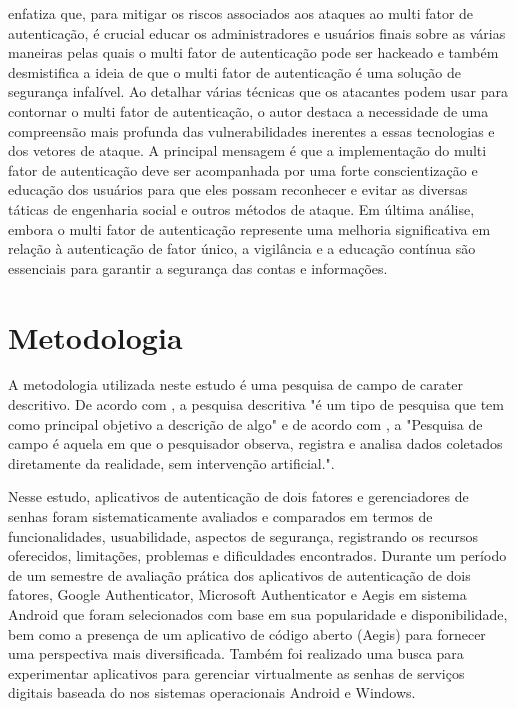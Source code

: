 \documentclass[12pt]{article}
\begin{document}
\cite{article:3} enfatiza que, para mitigar os riscos associados aos ataques ao multi fator de
autenticação, é crucial educar os administradores e usuários finais sobre as várias maneiras
pelas quais o multi fator de autenticação pode ser hackeado e também desmistifica a ideia de que
o multi fator de autenticação é uma solução de segurança infalível.
Ao detalhar várias técnicas que os atacantes podem usar para contornar o multi fator de
autenticação, o autor destaca a necessidade de uma compreensão mais profunda das
vulnerabilidades inerentes a essas tecnologias e dos vetores de ataque.
A principal mensagem é que a implementação do multi fator de autenticação deve ser
acompanhada por uma forte conscientização e educação dos usuários para que eles possam
reconhecer e evitar as diversas táticas de engenharia social e outros métodos de ataque.
Em última análise, embora o multi fator de autenticação represente uma melhoria
significativa em relação à autenticação de fator único, a vigilância e a educação
contínua são essenciais para garantir a segurança das contas e informações.

\section{Metodologia}

A metodologia utilizada neste estudo é uma pesquisa de campo de carater descritivo.
De acordo com \cite{malhotra2001}, a pesquisa descritiva "é um tipo de
pesquisa que tem como principal objetivo a descrição de algo" e de acordo com
\cite{lakatos2017}, a "Pesquisa de campo é aquela em que o pesquisador observa,
registra e analisa dados coletados diretamente da realidade, sem intervenção
artificial.".

Nesse estudo, aplicativos de autenticação de dois fatores e gerenciadores de senhas
foram sistematicamente avaliados e comparados em termos de funcionalidades, usuabilidade,
aspectos de segurança, registrando os recursos oferecidos, limitações, problemas e
dificuldades encontrados.
Durante um período de um semestre de avaliação prática dos aplicativos de autenticação de
dois fatores, Google Authenticator, Microsoft Authenticator e Aegis em sistema Android que
foram selecionados com base em sua popularidade e disponibilidade, bem como a presença de
um aplicativo de código aberto (Aegis) para fornecer uma perspectiva mais diversificada.
Também foi realizado uma busca para experimentar aplicativos para gerenciar virtualmente
as senhas de serviços digitais baseada do nos sistemas operacionais Android e Windows.
\end{document}
